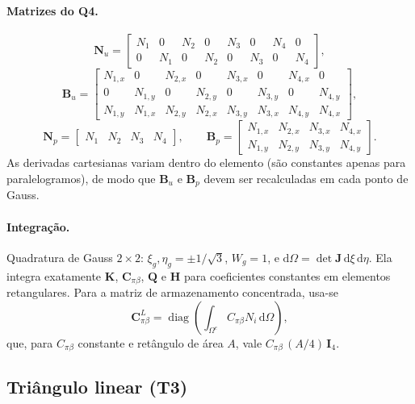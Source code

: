 \documentclass[11pt,a4paper]{article}
\numberwithin{equation}{section}
\newcommand{\dd}{\mathrm{d}}
\begin{document}
\paragraph{Matrizes do Q4.}
\begin{equation}
\boxed{\mathbf N_u=\begin{bmatrix}
N_1&0&N_2&0&N_3&0&N_4&0\\
0&N_1&0&N_2&0&N_3&0&N_4
\end{bmatrix},}
\end{equation}
\begin{equation}
\boxed{\mathbf B_u=\begin{bmatrix}
N_{1,x}&0&N_{2,x}&0&N_{3,x}&0&N_{4,x}&0\\
0&N_{1,y}&0&N_{2,y}&0&N_{3,y}&0&N_{4,y}\\
N_{1,y}&N_{1,x}&N_{2,y}&N_{2,x}&N_{3,y}&N_{3,x}&N_{4,y}&N_{4,x}
\end{bmatrix},}
\end{equation}
\begin{equation}
\boxed{\mathbf N_p=\begin{bmatrix}N_1&N_2&N_3&N_4\end{bmatrix},\qquad
\mathbf B_p=\begin{bmatrix}
N_{1,x}&N_{2,x}&N_{3,x}&N_{4,x}\\
N_{1,y}&N_{2,y}&N_{3,y}&N_{4,y}
\end{bmatrix}.}
\end{equation}
As derivadas cartesianas variam dentro do elemento (são constantes apenas
para paralelogramos), de modo que $\mathbf B_u$ e $\mathbf B_p$ devem ser
recalculadas em cada ponto de Gauss.

\paragraph{Integração.} Quadratura de Gauss $2\times2$:
$\xi_g,\eta_g=\pm1/\sqrt3$, $W_g=1$, e $\dd\Omega=\det\mathbf J\,\dd\xi\,\dd\eta$.
Ela integra exatamente $\mathbf K$, $\mathbf C_{\pi\beta}$, $\mathbf Q$ e
$\mathbf H$ para coeficientes constantes em elementos retangulares.
Para a matriz de armazenamento concentrada, usa-se
\begin{equation}
\mathbf C_{\pi\beta}^{L}=\operatorname{diag}\left(\int_{\Omega^e}C_{\pi\beta}N_i\,\dd\Omega\right),
\end{equation}
que, para $C_{\pi\beta}$ constante e retângulo de área $A$, vale
$C_{\pi\beta}\,(A/4)\,\mathbf I_4$.

\subsection{Triângulo linear (T3)}
\end{document}
